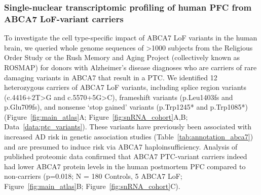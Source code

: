 \subsubsection{Single-nuclear transcriptomic profiling of human PFC from ABCA7 LoF-variant carriers} 
To investigate the cell type-specific impact of ABCA7 LoF variants in the human brain, we queried whole genome sequences of >1000 subjects from the Religious Order Study or the Rush Memory and Aging Project (collectively known as ROSMAP) for donors with Alzheimer’s disease diagnoses who are carriers of rare damaging variants in ABCA7 that result in a PTC. We identified 12 heterozygous carriers of ABCA7 LoF variants, including splice region variants (c.4416+2T>G and c.5570+5G>C), frameshift variants (p.Leu1403fs and p.Glu709fs), and nonsense ‘stop gained’ variants (p.Trp1245* and p.Trp1085*) (Figure~\ref{fig:main_atlas}A; Figure~\ref{fig:snRNA_cohort}A,B; Data~\ref{data:ptc_variants}). These variants have previously been associated with increased AD risk in genetic association studies (Table~\ref{tab:annotation_abca7})\cite{Steinberg2015-mu,Holstege2022-vp} and are presumed to induce risk via ABCA7 haploinsufficiency\cite{Duchateau2024-rf}. Analysis of published proteomic data\cite{Johnson2020-ip} confirmed that ABCA7 PTC-variant carriers indeed had lower ABCA7 protein levels in the human postmortem PFC compared to non-carriers (p=0.018; N = 180 Controls, 5 ABCA7 LoF; Figure~\ref{fig:main_atlas}B; Figure~\ref{fig:snRNA_cohort}C). 

